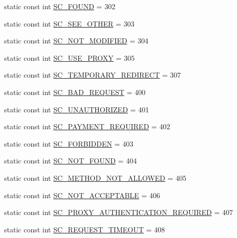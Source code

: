 \begin{DoxyCompactItemize}
\item 
static const int \hyperlink{class_http_servlet_response_ae54f6fa42eaa909df22ecf6c199be6b3}{S\+C\+\_\+\+F\+O\+U\+ND} = 302
\item 
static const int \hyperlink{class_http_servlet_response_af538867138f24543a02ac5c5410e243b}{S\+C\+\_\+\+S\+E\+E\+\_\+\+O\+T\+H\+ER} = 303
\item 
static const int \hyperlink{class_http_servlet_response_a6bc033cc9c8ace2147c062614f96ea13}{S\+C\+\_\+\+N\+O\+T\+\_\+\+M\+O\+D\+I\+F\+I\+ED} = 304
\item 
static const int \hyperlink{class_http_servlet_response_ae1007c3d5ef35b7b0ac0efc384646a57}{S\+C\+\_\+\+U\+S\+E\+\_\+\+P\+R\+O\+XY} = 305
\item 
static const int \hyperlink{class_http_servlet_response_a11d52c2ec969ec55109146b5950bc092}{S\+C\+\_\+\+T\+E\+M\+P\+O\+R\+A\+R\+Y\+\_\+\+R\+E\+D\+I\+R\+E\+CT} = 307
\item 
static const int \hyperlink{class_http_servlet_response_a2a226ac2c949f84ccaf7a9391d5e3bfb}{S\+C\+\_\+\+B\+A\+D\+\_\+\+R\+E\+Q\+U\+E\+ST} = 400
\item 
static const int \hyperlink{class_http_servlet_response_a078b503f786bdc710241b45ea940cb15}{S\+C\+\_\+\+U\+N\+A\+U\+T\+H\+O\+R\+I\+Z\+ED} = 401
\item 
static const int \hyperlink{class_http_servlet_response_a48bba48d3819553a9d6b417600bf5716}{S\+C\+\_\+\+P\+A\+Y\+M\+E\+N\+T\+\_\+\+R\+E\+Q\+U\+I\+R\+ED} = 402
\item 
static const int \hyperlink{class_http_servlet_response_a21aa92f30b818c275d3c02be2723df0e}{S\+C\+\_\+\+F\+O\+R\+B\+I\+D\+D\+EN} = 403
\item 
static const int \hyperlink{class_http_servlet_response_a6679d67932547329af549e45a4b86a52}{S\+C\+\_\+\+N\+O\+T\+\_\+\+F\+O\+U\+ND} = 404
\item 
static const int \hyperlink{class_http_servlet_response_afb9aad2def9e3f3741011ec874f81f8d}{S\+C\+\_\+\+M\+E\+T\+H\+O\+D\+\_\+\+N\+O\+T\+\_\+\+A\+L\+L\+O\+W\+ED} = 405
\item 
static const int \hyperlink{class_http_servlet_response_a9016d30f4bba75878996ec9b0351cfdc}{S\+C\+\_\+\+N\+O\+T\+\_\+\+A\+C\+C\+E\+P\+T\+A\+B\+LE} = 406
\item 
static const int \hyperlink{class_http_servlet_response_a94f54353eed1b19a42becd7bc7b91c17}{S\+C\+\_\+\+P\+R\+O\+X\+Y\+\_\+\+A\+U\+T\+H\+E\+N\+T\+I\+C\+A\+T\+I\+O\+N\+\_\+\+R\+E\+Q\+U\+I\+R\+ED} = 407
\item 
static const int \hyperlink{class_http_servlet_response_af3d39e84355ff115e7218a217424ac30}{S\+C\+\_\+\+R\+E\+Q\+U\+E\+S\+T\+\_\+\+T\+I\+M\+E\+O\+UT} = 408

\end{DoxyCompactItemize}
